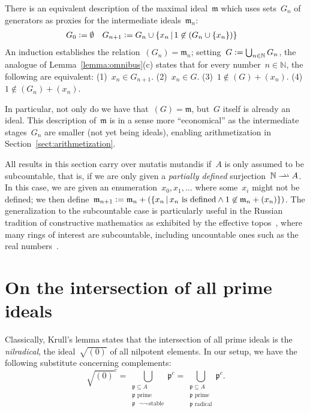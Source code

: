 \documentclass[envcountsect,envcountsame,runningheads]{llncs}
\newcommand{\mmm}{\mathfrak{m}}
\newcommand{\ppp}{\mathfrak{p}}
\newcommand{\NN}{\mathbb{N}}
\newcommand{\defeq}{\vcentcolon=}
\renewcommand{\_}{\mathpunct{.}\,}
\begin{document}
\begin{remark}\label{rem:via-generators}There is an equivalent description of the
maximal ideal~$\mmm$ which uses sets~$G_n$ of generators as proxies for the
intermediate ideals~$\mmm_n$:
\begin{align*}
  G_0 &\defeq \emptyset &
  G_{n+1} &\defeq G_n \cup \{ x_n \,|\, 1 \not\in (G_n \cup \{ x_n \}) \}
\end{align*}
An induction establishes the relation~$(G_n) = \mmm_n$; setting~$G \defeq
\bigcup_{n\in\NN} G_n$, the analogue of Lemma~\ref{lemma:omnibus}(c) states
that for every number~$n \in \NN$, the following are equivalent:
(1)~$x_n \in G_{n+1}$.
(2)~$x_n \in G$.
(3)~$1 \not\in (G) + (x_n)$.
(4)~$1 \not\in (G_n) + (x_n)$.

In particular, not only do we have that~$(G) = \mmm$, but~$G$ itself is already
an ideal. This description of~$\mmm$ is in a sense more ``economical'' as the
intermediate stages~$G_n$ are smaller (not yet being ideals), enabling
arithmetization in Section~\ref{sect:arithmetization}.
\end{remark}

\newcommand{\rightrightharpoonup}{\mathrel{\mathrlap{\rightharpoonup}\mkern1mu\rightharpoonup}}
\begin{remark}All results in this section carry over mutatis mutandis if~$A$ is
only assumed to be subcountable, that is, if we are only
given a \emph{partially defined} surjection~$\NN \rightrightharpoonup A$. In
this case, we are given an enumeration~$x_0,x_1,\ldots$ where some~$x_i$
might not be defined; we then define~$\mmm_{n+1} \defeq
\mmm_n + (\{ x_n \,|\, \text{$x_n$ is defined} \wedge 1 \not\in \mmm_n + (x_n) \})$.
The generalization to the subcountable case is particularly useful in the
Russian tradition of constructive mathematics as exhibited by the ef{}fective
topos~\cite{hyland:effective-topos,oosten:realizability,phoa:effective,bauer:c2c},
where many rings of interest are subcountable, including uncountable ones such as the real
numbers~\cite[Prop.~7.2]{hyland:effective-topos}.
\end{remark}


\section{On the intersection of all prime ideals}

Classically, Krull's lemma states that the intersection of all prime ideals is the
\emph{nilradical}, the ideal~$\sqrt{(0)}$ of all nilpotent elements. In our
setup, we have the following substitute concerning complements:
\[ \sqrt{(0)}^c =
  \bigcup_{\substack{\text{$\ppp \subseteq A$}\\\text{$\ppp$ prime}\\\text{$\ppp$ $\neg\neg$-stable}}} \ppp^c =
  \bigcup_{\substack{\text{$\ppp \subseteq A$}\\\text{$\ppp$ prime}\\\text{$\ppp$ radical}}} \ppp^c. \]
\end{document}
